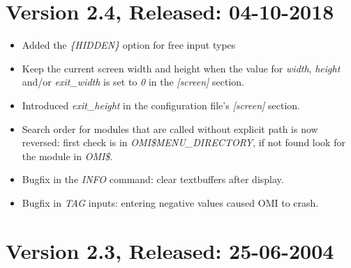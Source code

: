 \documentclass[a4paper]{book}
\begin{document}
\section*{Version 2.4, Released: 04-10-2018}

\begin{itemize}
\item Added the \textsl{\{HIDDEN\}} option for free input types
\item Keep the current screen width and height when the value for \textsl{width}, \textsl{height} and/or \textsl{exit{\_}width} is set to \textsl{0} in the \textsl{[screen]} section.
\item Introduced \textsl{exit{\_}height} in the configuration file's \textsl{[screen]} section.
\item Search order for modules that are called without explicit path is now reversed: first check is in \textsl{OMI{\$}MENU{\_}DIRECTORY}, if not found look for the module in \textsl{OMI{\$}}.
\item Bugfix in the \textsl{INFO} command: clear textbuffers after display.
\item Bugfix in \textsl{TAG} inputs: entering negative values caused OMI to crash.
\end{itemize}

\section*{Version 2.3, Released: 25-06-2004}
\end{document}
